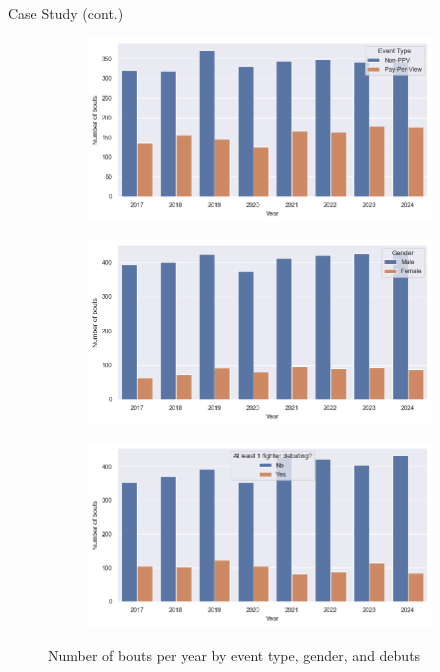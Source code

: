 \documentclass[aspectratio=169,xcolor=dvipsnames]{beamer}
\begin{document}
\begin{frame}{Case Study (cont.)}
    \begin{figure}[!htb]
    \centering
    \captionsetup{justification=centering}
    \begin{subfigure}{0.3\linewidth}
      \centering
      \includegraphics[width=\linewidth]{figures/event_type_by_year.png}
    \end{subfigure}
    \begin{subfigure}{0.3\linewidth}
      \centering
      \includegraphics[width=\linewidth]{figures/gender_by_year.png}
    \end{subfigure}
    \begin{subfigure}{0.3\linewidth}
      \centering
      \includegraphics[width=\linewidth]{figures/debuts_by_year.png}
    \end{subfigure}
    \caption{Number of bouts per year by event type, gender, and debuts}
    \end{figure}
\end{frame}
\end{document}

